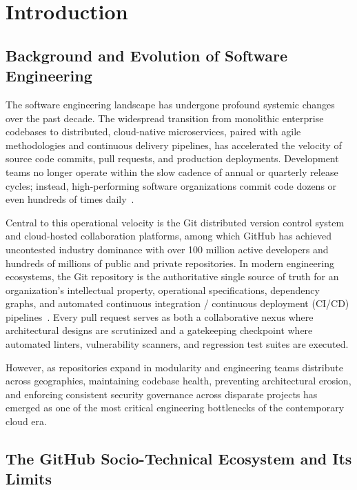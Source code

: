 \chapter{Introduction}
\label{chap:introduction}

\section{Background and Evolution of Software Engineering}
\label{sec:background}

The software engineering landscape has undergone profound systemic changes over the past decade. The widespread transition from monolithic enterprise codebases to distributed, cloud-native microservices, paired with agile methodologies and continuous delivery pipelines, has accelerated the velocity of source code commits, pull requests, and production deployments. Development teams no longer operate within the slow cadence of annual or quarterly release cycles; instead, high-performing software organizations commit code dozens or even hundreds of times daily~\cite{forsgren2018accelerate}. 

Central to this operational velocity is the Git distributed version control system~\cite{chacon2014pro} and cloud-hosted collaboration platforms, among which GitHub has achieved uncontested industry dominance with over 100 million active developers and hundreds of millions of public and private repositories. In modern engineering ecosystems, the Git repository is the authoritative single source of truth for an organization's intellectual property, operational specifications, dependency graphs, and automated continuous integration / continuous deployment (CI/CD) pipelines~\cite{humble2010continuous}. Every pull request serves as both a collaborative nexus where architectural designs are scrutinized and a gatekeeping checkpoint where automated linters, vulnerability scanners, and regression test suites are executed.

However, as repositories expand in modularity and engineering teams distribute across geographies, maintaining codebase health, preventing architectural erosion, and enforcing consistent security governance across disparate projects has emerged as one of the most critical engineering bottlenecks of the contemporary cloud era.

\section{The GitHub Socio-Technical Ecosystem and Its Limits}
\label{sec:github-limits}

